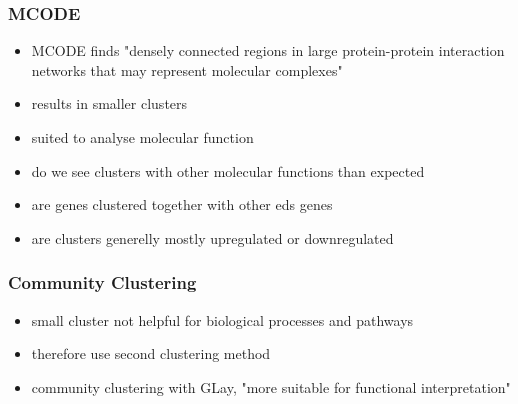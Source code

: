 \subsubsection{MCODE}
\begin{itemize}
	\item MCODE finds "densely connected regions in large protein-protein interaction networks that may represent molecular complexes" \cite{mcode}
	\item results in smaller clusters
	\item suited to analyse molecular function
	\item do we see clusters with other molecular functions than expected
	\item are genes clustered together with other eds genes
	\item are clusters generelly mostly upregulated or downregulated
\end{itemize}
\subsubsection{Community Clustering}
\begin{itemize}
	\item small cluster not helpful for biological processes and pathways
	\item therefore use second clustering method
	\item community clustering with GLay, "more suitable for functional interpretation" \cite{GLay}
\end{itemize}